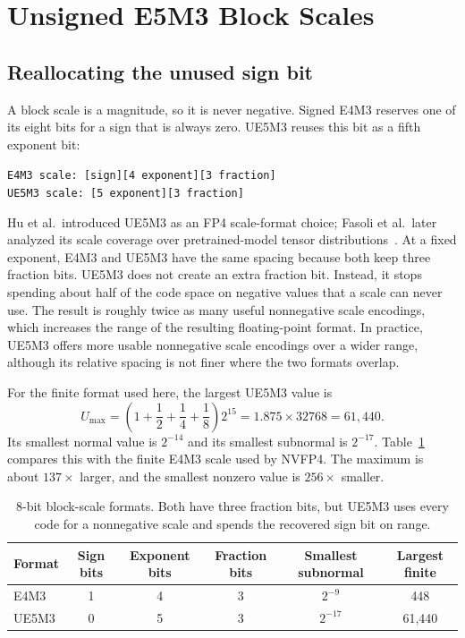 \documentclass[11pt]{article}
\newcommand{\ue}{UE5M3}
\newcommand{\nv}{NVFP4}
\newcommand{\eformat}[1]{\texttt{#1}}
\begin{document}
\section{Unsigned E5M3 Block Scales}

\subsection{Reallocating the unused sign bit}

A block scale is a magnitude, so it is never negative.  Signed E4M3 reserves
one of its eight bits for a sign that is always zero.  \ue{} reuses this bit as
a fifth exponent bit:
\begin{center}
  \eformat{E4M3 scale: [sign][4 exponent][3 fraction]}\\
  \eformat{UE5M3 scale:       [5 exponent][3 fraction]}
\end{center}
Hu et al.\ introduced \ue{} as an FP4 scale-format choice; Fasoli et al.\ later
analyzed its scale coverage over pretrained-model tensor
distributions~\citep{hu2025designspace,fasoli2026finer}.
At a fixed exponent, E4M3 and \ue{} have the same spacing because both keep
three fraction bits.  \ue{} does not create an extra fraction bit.  Instead,
it stops spending about half of the code space on negative values that a scale
can never use.  The result is roughly twice as many useful nonnegative scale
encodings, which increases the range of the resulting floating-point format.
In practice, \ue{} offers more usable nonnegative scale encodings over a wider
range, although its relative spacing is not finer where the two formats overlap.

For the finite format used here, the largest \ue{} value is
\begin{equation}
  U_{\max}
  = \left(1 + \frac12 + \frac14 + \frac18\right)2^{15}
  = 1.875\times 32768
  = 61{,}440.
  \label{eq:ue5m3max}
\end{equation}
Its smallest normal value is $2^{-14}$ and its smallest subnormal is $2^{-17}$.
Table~\ref{tab:scale-range} compares this with the finite E4M3 scale used by
\nv{}.  The maximum is about $137\times$ larger, and the smallest nonzero value
is $256\times$ smaller.

\begin{table}[H]
  \centering
  \caption{8-bit block-scale formats.  Both have three fraction bits, but
  \ue{} uses every code for a nonnegative scale and spends the recovered sign
  bit on range.}
  \label{tab:scale-range}
  \begin{tabular}{@{}lccccc@{}}
    \toprule
    Format & Sign bits & Exponent bits & Fraction bits & Smallest subnormal & Largest finite \\
    \midrule
    E4M3 & 1 & 4 & 3 & $2^{-9}$ & 448 \\
    \ue{} & 0 & 5 & 3 & $2^{-17}$ & 61,440 \\
    \bottomrule
  \end{tabular}
\end{table}
\end{document}
